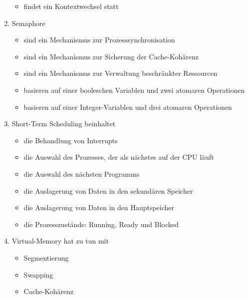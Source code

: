 \documentclass{exercisesheet}
\begin{document}
\begin{enumerate}
\begin{itemize}
          \item findet ein Kontextwechsel statt \checkmark
        \end{itemize}
  \item Semaphore
        \begin{itemize}
          \item sind ein Mechanismus zur Prozesssynchronisation \checkmark
          \item sind ein Mechanismus zur Sicherung der Cache-Kohärenz
          \item sind ein Mechanismus zur Verwaltung beschränkter Ressourcen \checkmark
          \item basieren auf einer booleschen Variablen und zwei atomaren Operationen
          \item basieren auf einer Integer-Variablen und drei atomaren Operationen
        \end{itemize}
  \item Short-Term Scheduling beinhaltet
        \begin{itemize}
          \item die Behandlung von Interrupts \checkmark
          \item die Auswahl des Prozesses, der als nächstes auf der CPU läuft \checkmark
          \item die Auswahl des nächsten Programms
          \item die Auslagerung von Daten in den sekundären Speicher
          \item die Auslagerung von Daten in den Hauptspeicher
          \item die Prozesszustände: Running, Ready und Blocked \checkmark
        \end{itemize}
  \item Virtual-Memory hat zu tun mit
        \begin{itemize}
          \item Segmentierung \checkmark
          \item Swapping \checkmark
          \item Cache-Kohärenz
        \end{itemize}
\end{enumerate}
\end{document}
